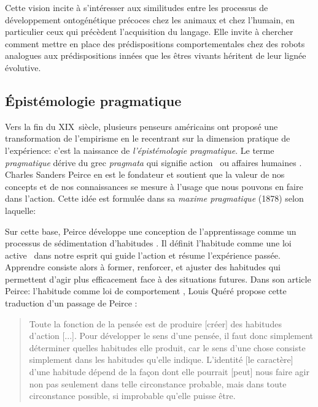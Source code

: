 Cette vision incite à s'intéresser aux similitudes entre les processus de développement ontogénétique précoces chez les animaux et chez l'humain, en particulier ceux qui précèdent l'acquisition du langage. 
Elle invite à chercher comment mettre en place des prédispositions comportementales chez des robots analogues aux prédispositions innées que les êtres vivants héritent de leur lignée évolutive.



\subsection{Épistémologie pragmatique}
\label{sec:pragmatisme}

\noindent
Vers la fin du XIX\ieme{}~siècle, plusieurs penseurs américains ont proposé une transformation de l'empirisme en le recentrant sur la dimension pratique de l'expérience: c'est la naissance de \emph{l'épistémologie pragmatique}. 
Le terme \emph{pragmatique} dérive du grec \emph{pragmata} qui signifie \og action \fg\ ou \og affaires humaines \fg.
Charles Sanders Peirce en est le fondateur et soutient que la valeur de nos concepts et de nos connaissances se mesure à l'usage que nous pouvons en faire dans l'action. 
Cette idée est formulée dans sa \emph{maxime pragmatique} (1878) selon laquelle: 
\begin{quote}
\cite{peirce_how_1878}
\end{quote}

Sur cette base, Peirce développe une conception de l'apprentissage comme un processus de \og sédimentation d'habitudes \fg.
Il définit l'habitude comme une  \og loi active \fg\ dans notre esprit qui guide l'action et résume l'expérience passée.  
Apprendre consiste alors à former, renforcer, et ajuster des habitudes qui permettent d'agir plus efficacement face à des situations futures.  
Dans son article \og Peirce: l'habitude comme loi de comportement \fg, Louis Quéré propose cette traduction d'un passage de Peirce :

\begin{quote}
\og Toute la fonction de la pensée est de produire [créer] des habitudes d’action [...]. 
Pour développer le sens d’une pensée, il faut donc simplement déterminer quelles habitudes elle produit, car le sens d’une chose consiste simplement dans les habitudes qu’elle indique. 
L’identité [le caractère] d’une habitude dépend de la façon dont elle pourrait [peut] nous faire agir non pas seulement dans telle circonstance probable, mais dans toute circonstance possible, si improbable qu’elle puisse être. \fg\ 
\cite[p.~3]{quere_peirce_2018}
\end{quote} 

